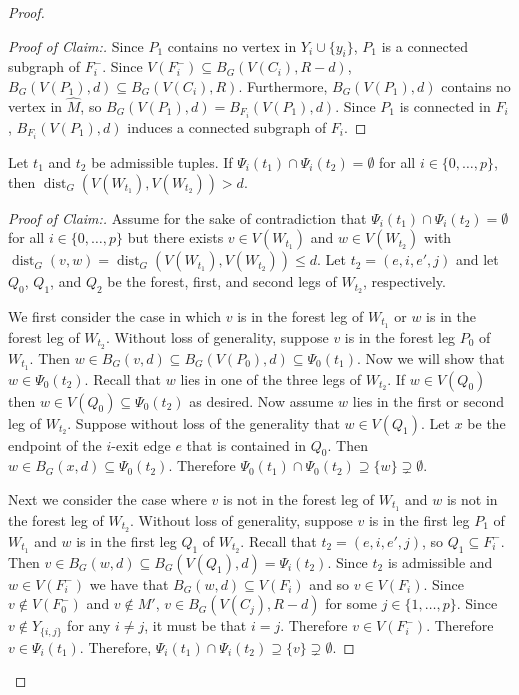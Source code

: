 \documentclass{patmorin}
\newcommand{\pat}[1]{\textcolor{Blue}{Pat: #1}}
\newenvironment{clmproof}{\begin{proof}[Proof of Claim:]\renewcommand{\qedsymbol}{\rule{1ex}{1ex}}}{\end{proof}}
\DeclareMathOperator{\dist}{dist}
\begin{document}
\begin{proof}
\begin{clmproof}
    Since $P_1$ contains no vertex in $Y_i\cup\{y_i\}$, $P_1$ is a connected
    subgraph of $F_i^-$.  Since $V(F^-_i)\subseteq B_G(V(C_i),R-d)$, $B_G(V(P_1),d)\subseteq B_G(V(C_i),R)$.  Furthermore, $B_G(V(P_1),d)$ contains no vertex in $\widehat{M}$, so $B_G(V(P_1),d)=B_{F_i}(V(P_1),d)$. 
    Since $P_1$ is connected in $F_i$, 
    $B_{F_i}(V(P_1),d)$ induces a connected subgraph of $F_i$. 
\end{clmproof}


\begin{clm}\label{w_distance}
  Let $t_1$ and $t_2$ be admissible tuples.
  If $\Psi_i(t_1)\cap \Psi_i(t_2)=\emptyset$ for all $i\in\{0,\ldots,p\}$, 
  then $\dist_G(V(W_{t_1}),V(W_{t_2}))> d$.  
\end{clm}



\begin{clmproof}
  Assume for the sake of contradiction that $\Psi_i(t_1)\cap\Psi_i(t_2)=\emptyset$ for all $i\in\{0,\ldots,p\}$ but there exists $v\in V(W_{t_1})$ and $w\in V(W_{t_2})$ with $\dist_G(v,w)=\dist_G(V(W_{t_1}),V(W_{t_2})) \le d$.
  Let $t_2=(e,i,e',j)$ and let $Q_0$, $Q_1$, and $Q_2$ be the forest, first, and second legs of $W_{t_2}$, respectively.

  We first consider the case in which $v$ is in the forest leg of $W_{t_1}$ or $w$ is in the forest leg of $W_{t_2}$.   Without loss of generality, suppose $v$ is in the forest leg $P_0$ of $W_{t_1}$. 
  Then $w\in B_G(v,d)\subseteq B_G(V(P_0),d)\subseteq\Psi_0(t_1)$.  Now we will show that $w\in \Psi_0(t_2)$.   Recall that $w$ lies in one of the three legs of $W_{t_2}$. 
  If $w\in V(Q_0)$ then $w\in V(Q_0)\subseteq \Psi_0(t_2)$ as desired. 
  Now assume $w$ lies in the first or second leg of $W_{t_2}$.
  Suppose without loss of the generality that $w\in V(Q_1)$. 
  Let $x$ be the endpoint of the $i$-exit edge $e$ that is contained in $Q_0$.
  Then $w\in B_G(x,d)\subseteq\Psi_0(t_2)$.
  Therefore $\Psi_0(t_1)\cap\Psi_0(t_2)\supseteq\{w\}\supsetneq\emptyset$.

  Next we consider the case where $v$ is not in the forest leg of $W_{t_1}$ and $w$ is not in the forest leg of $W_{t_2}$.  Without loss of generality, suppose $v$ is in the first leg $P_1$ of $W_{t_1}$ and $w$ is in the first leg $Q_1$ of $W_{t_2}$. 
  Recall that $t_2=(e,i,e',j)$, so $Q_1\subseteq F_i^-$. 
  Then $v\in B_G(w,d)\subseteq B_G(V(Q_1),d) = \Psi_i(t_2)$.  
  Since $t_2$ is admissible and $w\in V(F^-_i)$ we have that $B_G(w,d) \subseteq V(F_i)$ and so $v\in V(F_i)$. 
  Since $v\not\in V(F_0^-)$ and $v\not\in M'$, 
  $v\in B_G(V(C_j),R-d)$ for some $j\in\{1,\ldots,p\}$.  Since $v\notin Y_{\{i,j\}}$ for any $i\neq j$, it must be that $i=j$. Therefore $v\in V(F^-_i)$.  Therefore $v\in\Psi_i(t_1)$.
  Therefore, $\Psi_i(t_1)\cap\Psi_i(t_2)\supseteq\{v\}\supsetneq \emptyset$. 
\end{clmproof}



\end{proof}
\end{document}
